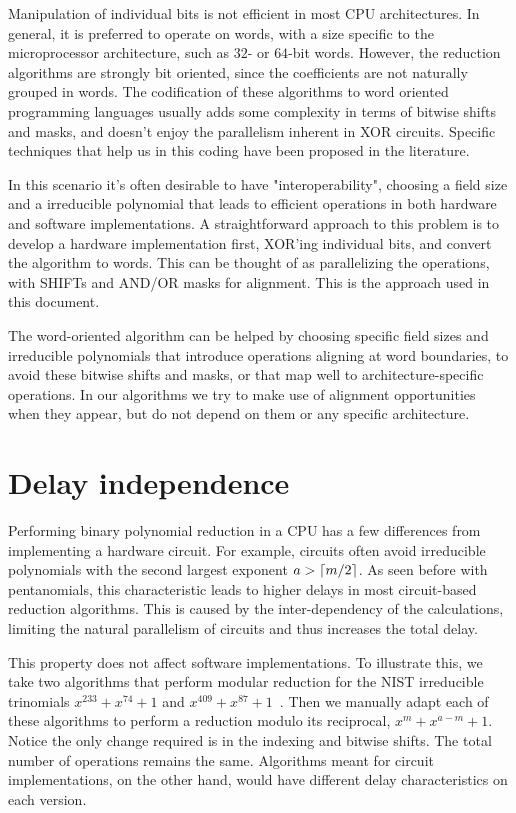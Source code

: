 Manipulation of individual bits is not efficient in most CPU architectures. In general, it is preferred to operate on words, with a size specific to the microprocessor architecture, such as $32$- or $64$-bit words. However, the reduction algorithms are strongly bit oriented, since the coefficients are not naturally grouped in words. The codification of these algorithms to word oriented programming languages usually adds some complexity in terms of bitwise shifts and masks, and doesn't enjoy the parallelism inherent in XOR circuits. Specific techniques that help us in this coding have been proposed in the literature\cite{Hilewitz2008}. 

In this scenario it's often desirable to have "interoperability", choosing a field size and a irreducible polynomial that leads to efficient operations
in both hardware and software implementations. A straightforward
approach to this problem is to develop a hardware implementation first,
XOR'ing individual bits, and convert the algorithm to words. This can be
thought of as parallelizing the operations, with SHIFTs and AND/OR masks
for alignment. This is the approach used in this document.

The word-oriented algorithm can be helped by choosing specific field sizes and irreducible polynomials that introduce operations aligning at word boundaries, to avoid these bitwise shifts and masks, or that map well to architecture-specific operations. In our algorithms we try to make use of alignment opportunities when they appear, but do not depend on them or any specific architecture.

\section{Delay independence}

Performing binary polynomial reduction in a CPU has a few differences from implementing a hardware circuit. For example, circuits often avoid irreducible polynomials with the second largest exponent $a > \lceil m/2\rceil$. As seen before with pentanomials, this characteristic leads to higher delays in most circuit-based reduction algorithms. This is caused by the inter-dependency of the calculations, limiting the natural parallelism of circuits and thus increases the total delay.

This property does not affect software implementations. To illustrate this, we take two algorithms that perform modular reduction for the NIST irreducible trinomials $x^{233} + x^{74} + 1$ and $x^{409} + x^{87} + 1$~\cite[p. 55]{hankerson2006guide}. Then we manually adapt each of these algorithms to perform a reduction modulo its reciprocal, $x^m + x^{a-m} + 1$. Notice the only change required is in the indexing and bitwise shifts. The total number of operations remains the same. Algorithms meant for circuit implementations, on the other hand, would have different delay characteristics on each version. %

